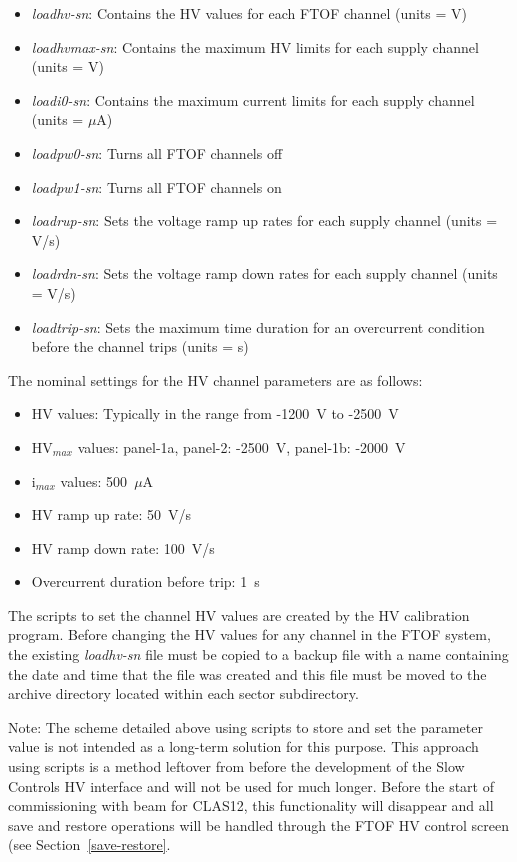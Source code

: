 \documentclass[letterpaper,10pt]{article}
\begin{document}
\begin{itemize}
\item {\it loadhv-sn}: Contains the HV values for each FTOF channel (units = V)
\item {\it loadhvmax-sn}: Contains the maximum HV limits for each supply channel (units = V)
\item {\it loadi0-sn}: Contains the maximum current limits for each supply channel (units = $\mu$A)
\item {\it loadpw0-sn}: Turns all FTOF channels off
\item {\it loadpw1-sn}: Turns all FTOF channels on
\item {\it loadrup-sn}: Sets the voltage ramp up rates for each supply channel (units = V/s)
\item {\it loadrdn-sn}: Sets the voltage ramp down rates for each supply channel (units = V/s)
\item {\it loadtrip-sn}: Sets the maximum time duration for an overcurrent condition before the 
channel trips (units = s)
\end{itemize}

The nominal settings for the HV channel parameters are as follows:

\begin{itemize}
\item HV values: Typically in the range from -1200~V to -2500~V
\item HV$_{max}$ values: panel-1a, panel-2: -2500~V, panel-1b: -2000~V
\item i$_{max}$ values: 500~$\mu$A
\item HV ramp up rate: 50~V/s
\item HV ramp down rate: 100~V/s
\item Overcurrent duration before trip: 1~s
\end{itemize}

The scripts to set the channel HV values are created by the HV calibration program. Before changing 
the HV values for any channel in the FTOF system, the existing {\it loadhv-sn} file must be copied to 
a backup file with a name containing the date and time that the file was created and this file must be 
moved to the archive directory located within each sector subdirectory.

Note: The scheme detailed above using scripts to store and set the parameter value is not intended
as a long-term solution for this purpose. This approach using scripts is a method leftover from before 
the development of the Slow Controls HV interface and will not be used for much longer. Before the 
start of commissioning with beam for CLAS12, this functionality will disappear and all save and restore 
operations will be handled through the FTOF HV control screen (see Section~\ref{save-restore}.
\end{document}
